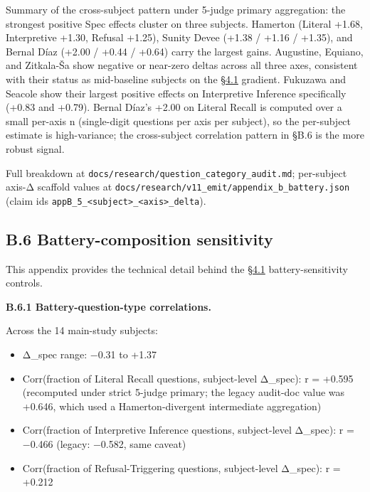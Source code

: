 Summary of the cross-subject pattern under 5-judge primary aggregation:
the strongest positive Spec effects cluster on three subjects. Hamerton
(Literal +1.68, Interpretive +1.30, Refusal +1.25), Sunity Devee (+1.38
/ +1.16 / +1.35), and Bernal Díaz (+2.00 / +0.44 / +0.64) carry the
largest gains. Augustine, Equiano, and Zitkala-Ša show negative or
near-zero deltas across all three axes, consistent with their status as
mid-baseline subjects on the \hyperref[the-cross-subject-gradient-and-its-per-question-mechanism]{§4.1} gradient. Fukuzawa and Seacole show
their largest positive effects on Interpretive Inference specifically
(+0.83 and +0.79). Bernal Díaz's +2.00 on Literal Recall is computed
over a small per-axis n (single-digit questions per axis per subject),
so the per-subject estimate is high-variance; the cross-subject
correlation pattern in §B.6 is the more robust signal.

Full breakdown at \texttt{docs/research/question\_category\_audit.md};
per-subject axis-Δ scaffold values at
\texttt{docs/research/v11\_emit/appendix\_b\_battery.json} (claim ids
\texttt{appB\_5\_\textless{}subject\textgreater{}\_\textless{}axis\textgreater{}\_delta}).

\hypertarget{b.6-battery-composition-sensitivity}{%
\subsection{B.6 Battery-composition
sensitivity}\label{b.6-battery-composition-sensitivity}}

This appendix provides the technical detail behind the \hyperref[the-cross-subject-gradient-and-its-per-question-mechanism]{§4.1}
battery-sensitivity controls.

\textbf{B.6.1 Battery-question-type correlations.}

Across the 14 main-study subjects:

\begin{itemize}
\tightlist
\item
  Δ\_spec range: −0.31 to +1.37
\item
  Corr(fraction of Literal Recall questions, subject-level Δ\_spec): r =
  +0.595 (recomputed under strict 5-judge primary; the legacy audit-doc
  value was +0.646, which used a Hamerton-divergent intermediate
  aggregation)
\item
  Corr(fraction of Interpretive Inference questions, subject-level
  Δ\_spec): r = −0.466 (legacy: −0.582, same caveat)
\item
  Corr(fraction of Refusal-Triggering questions, subject-level Δ\_spec):
  r = +0.212
\end{itemize}

